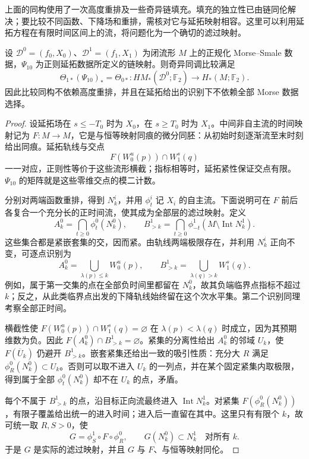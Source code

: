 上面的同构使用了一次高度重排及一些奇异链填充。填充的独立性已由链同伦解决；要比较不同函数、下降场和重排，需核对它与延拓映射相容。这里可以利用延拓方程在有限时间区间上的流，将问题化为一个确切的滤过映射。

\begin{proposition}\label{g2:prop:morse-comparison-continuation}
	设 \(\mathcal D^0=(f_0,X_0)\)、\(\mathcal D^1=(f_1,X_1)\) 为闭流形 \(M\) 上的正规化 Morse--Smale 数据，\(\Psi_{10}\) 为正则延拓数据所定义的链映射。则奇异同调比较满足
	\[
		\Theta_{1*}(\Psi_{10})_*=\Theta_{0*}:
		HM_*(\mathcal D^0;\mathbb F_2)\longrightarrow H_*(M;\mathbb F_2).
	\]
	因此比较同构不依赖高度重排，并且在延拓给出的识别下不依赖全部 Morse 数据选择。
\end{proposition}
\begin{proof}
	设延拓场在 \(s\le -T_0\) 时为 \(X_0\)，在 \(s\ge T_0\) 时为 \(X_1\)。中间非自主流的时间映射记为 \(F:M\to M\)，它是与恒等映射同痕的微分同胚：从初始时刻逐渐流至末时刻给出同痕。延拓轨线与交点
	\[
		F(W^u_0(p))\cap W^s_1(q)
	\]
	一一对应，正则性等价于这些流形横截；指标相等时，延拓紧性保证交点有限。\(\Psi_{10}\) 的矩阵就是这些零维交点的模二计数。

	分别对两端函数重排，得到 \(N^i_k\)，并用 \(\phi_t^i\) 记 \(X_i\) 的自主流。下面说明可在 \(F\) 前后各复合一个充分长的正时间流，使其成为全部层的滤过映射。定义
	\[
		A^0_k=\bigcap_{t\ge0}\phi_t^0(N^0_k),\qquad
		B^1_{>k}=\bigcap_{t\ge0}\phi_{-t}^1(M\setminus\operatorname{Int}N^1_k).
	\]
	这些集合都是紧嵌套集的交，因而紧。由轨线两端极限存在，并利用 \(N^i_k\) 正向不变，可逐点识别为
	\[
		A^0_k=\bigcup_{\lambda(p)\le k}W^u_0(p),\qquad
		B^1_{>k}=\bigcup_{\lambda(q)>k}W^s_1(q).
	\]
	例如，属于第一交集的点在全部负时间里都留在 \(N^0_k\)，故其负端临界点指标不超过 \(k\)；反之，从此类临界点出发的下降轨线始终留在这个次水平集。第二个识别同理考察全部正时间。

	横截性使
	\(F(W^u_0(p))\cap W^s_1(q)=\varnothing\)
	在 \(\lambda(p)<\lambda(q)\) 时成立，因为其预期维数为负。因此 \(F(A^0_k)\cap B^1_{>k}=\varnothing\)。紧集的分离性给出 \(A^0_k\) 的邻域 \(U_k\)，使 \(F(\overline U_k)\) 仍避开 \(B^1_{>k}\)。嵌套紧集还给出一致的吸引性质：充分大 \(R\) 满足 \(\phi_R^0(N^0_k)\subset U_k\)。否则可以取不进入 \(U_k\) 的一列点，并在某个固定紧集内取极限，得到属于全部 \(\phi_t^0(N^0_k)\) 却不在 \(U_k\) 的点，矛盾。

	每个不属于 \(B^1_{>k}\) 的点，沿目标正向流最终进入 \(\operatorname{Int}N^1_k\)。对紧集 \(F(\phi_R^0(N^0_k))\)，有限子覆盖给出统一的进入时间；进入后一直留在其中。这里只有有限个 \(k\)，故可统一取 \(R,S>0\)，使
	\[
		G=\phi_S^1\circ F\circ\phi_R^0,\qquad
		G(N^0_k)\subset N^1_k\quad\text{对所有 }k.
	\]
	于是 \(G\) 是实际的滤过映射，并且 \(G\) 与 \(F\)、与恒等映射同伦。


\end{proof}
